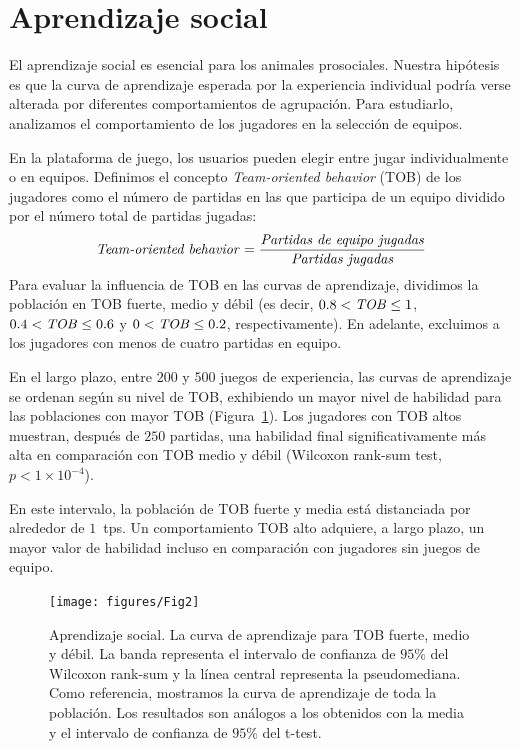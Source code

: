 \documentclass[a4paper,11pt]{book}
\theoremstyle{definition}
\begin{document}
\section{Aprendizaje social}

El aprendizaje social es esencial para los animales prosociales.
%
Nuestra hip\'otesis es que la curva de aprendizaje esperada por la experiencia individual podr\'ia verse alterada por diferentes comportamientos de agrupaci\'on.
%
Para estudiarlo, analizamos el comportamiento de los jugadores en la selecci\'on de equipos.


En la plataforma de juego, los usuarios pueden elegir entre jugar individualmente o en equipos.
%
Definimos el concepto \emph{Team-oriented behavior} (TOB) de los jugadores como el n\'umero de partidas en las que participa de un equipo dividido por el n\'umero total de partidas jugadas:
%
\begin{equation}
\text{\emph{Team-oriented behavior}} = \frac{\text{\emph{Partidas de equipo jugadas}}}{\text{\emph{Partidas jugadas}}}
\end{equation}
%
Para evaluar la influencia de TOB en las curvas de aprendizaje, dividimos la poblaci\'on en TOB fuerte, medio y d\'ebil (es decir, $0.8<\text{\emph{TOB}}\leq 1$, $0.4 <\text{\emph{TOB}}\leq 0.6$ y $0 <\text{\emph{TOB}}\leq 0.2$, respectivamente).
%
En adelante, excluimos a los jugadores con menos de cuatro partidas en equipo.


En el largo plazo, entre $200$ y $500$ juegos de experiencia, las curvas de aprendizaje se ordenan seg\'un su nivel de TOB, exhibiendo un mayor nivel de habilidad para las poblaciones con mayor TOB (Figura~\ref{learningskill_team_hasta4team}).
%
Los jugadores con TOB altos muestran, despu\'es de $250$ partidas, una habilidad final significativamente m\'as alta en comparaci\'on con TOB medio y d\'ebil (Wilcoxon rank-sum test, $p<1 \times10^{-4}$).


En este intervalo, la poblaci\'on de TOB fuerte y media est\'a distanciada por alrededor de $1$~tps.
%
Un comportamiento TOB alto adquiere, a largo plazo, un mayor valor de habilidad incluso en comparaci\'on con jugadores sin juegos de equipo.


\begin{figure}[ht!]
\centering
\texttt{[image: figures/Fig2]}
\caption{
Aprendizaje social.
%
La curva de aprendizaje para TOB fuerte, medio y d\'ebil.
%
La banda representa el intervalo de confianza de $95\%$ del Wilcoxon rank-sum y la l\'inea central representa la pseudomediana.
%
Como referencia, mostramos la curva de aprendizaje de toda la poblaci\'on.
%
Los resultados son an\'alogos a los obtenidos con la media y el intervalo de confianza de $95\%$ del t-test.
}
\label{learningskill_team_hasta4team}
\end{figure}
\end{document}
